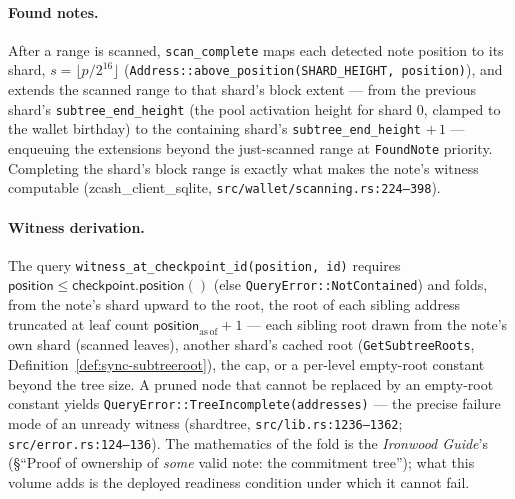 \documentclass[11pt,a4paper]{article}
\theoremstyle{definition}
\begin{document}
\paragraph{Found notes.} After a range is scanned,
\texttt{scan\_complete} maps each detected note position to its shard,
$s = \lfloor p / 2^{16} \rfloor$
(\texttt{Address::above\_position(SHARD\_HEIGHT, position)}), and
extends the scanned range to that shard's block extent --- from the
previous shard's \texttt{subtree\_end\_height} (the pool activation
height for shard $0$, clamped to the wallet birthday) to the containing
shard's \texttt{subtree\_end\_height} $+\,1$ --- enqueuing the
extensions beyond the just-scanned range at \texttt{FoundNote} priority.
Completing the shard's block range is exactly what makes the note's
witness computable
(\textsf{zcash\_client\_sqlite},
\texttt{src/wallet/scanning.rs:224--398}).

\paragraph{Witness derivation.} The query
\texttt{witness\_at\_checkpoint\_id(position, id)} requires
$\mathsf{position} \le \mathsf{checkpoint.position}()$ (else
\texttt{QueryError::NotContained}) and folds, from the note's shard
upward to the root, the root of each sibling address truncated at leaf
count $\mathsf{position}_{\mathrm{as\,of}} + 1$ --- each sibling root
drawn from the note's own shard (scanned leaves), another shard's cached
root (\texttt{GetSubtreeRoots},
Definition~\ref{def:sync-subtreeroot}), the cap, or a per-level
empty-root constant beyond the tree size. A pruned node that cannot be
replaced by an empty-root constant yields
\texttt{QueryError::}\allowbreak\texttt{TreeIncomplete(addresses)} ---
the precise failure
mode of an unready witness
(\textsf{shardtree}, \texttt{src/lib.rs:1236--1362};
\texttt{src/error.rs:124--136}). The mathematics of the fold is the
\emph{Ironwood Guide}'s (\S``Proof of ownership of \emph{some} valid
note: the commitment tree''); what this volume adds is the deployed
readiness condition under which it cannot fail.
\end{document}
